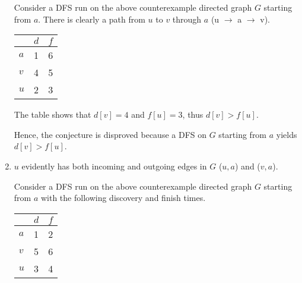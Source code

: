 \documentclass[a4paper]{report}
\begin{document}
\begin{enumerate}
      Consider a DFS run on the above counterexample directed graph $G$ starting from $a$.  
      There is clearly a path from $u$ to $v$ through $a$ (u $\rightarrow$ a $\rightarrow$ v).

      \begin{center}
        \begin{tabular}{ l | c | r }
          \hline
            & $d$ & $f$ \\ \hline
          $a$ & 1 & 6 \\
          $v$ & 4 & 5 \\
          $u$ & 2 & 3 \\
          \hline  
        \end{tabular}
      \end{center}

      The table shows that $d[v]=4$ and $f[u]=3$, thus $d[v] > f[u]$.

      Hence, the conjecture is disproved because a DFS on $G$ starting from $a$ yields $d[v] > f[u]$.


    \par
    \bigskip

    \item

      $u$ evidently has both incoming and outgoing edges in $G$ ($u,a$) and ($v,a$).

      Consider a DFS run on the above counterexample directed graph $G$ starting from $a$ with the 
      following discovery and finish times.  

      \begin{center}
        \begin{tabular}{ l | c | r }
          \hline
            & $d$ & $f$ \\ \hline
          $a$ & 1 & 2 \\
          $v$ & 5 & 6 \\
          $u$ & 3 & 4 \\
          \hline  
        \end{tabular}
      \end{center}



\end{enumerate}
\end{document}
